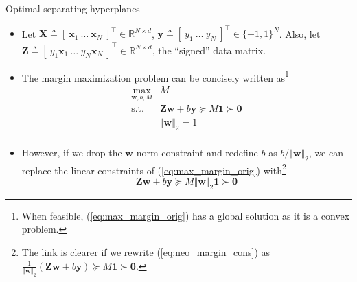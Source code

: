 \documentclass{beamer}
\numberwithin{equation}{section}
\newcommand{\aref}[1]{\alert{\ref{#1}}}
\begin{document}
\begin{frame}{Optimal separating hyperplanes}
    \begin{itemize}
        \item
        Let $ \mathbf{X} \triangleq [ \ \mathbf{x}_1 \ \ldots \
        \mathbf{x}_N \ ]^\top \in \mathbb{R}^{N \times d} $,
        $ \mathbf{y} \triangleq [ \ y_1 \ \ldots \ y_N \ ]^\top \in
        \{-1, 1\}^N $. Also, let $ \mathbf{Z} \triangleq [ \ y_1\mathbf{x}_1 \
        \ldots \ y_N\mathbf{x}_N \ ]^\top \in \mathbb{R}^{N \times d} $,
        the ``signed'' data matrix.

        \item
        The margin maximization problem can be concisely written as\footnote{
            When feasible, (\aref{eq:max_margin_orig}) has a global solution
            as it is a convex problem.
        }
        \begin{equation} \label{eq:max_margin_orig}
            \begin{array}{ll}
                \displaystyle\max_{\mathbf{w}, b, M} & M \\
                \text{s.t.} &
                \mathbf{Z}\mathbf{w} + b\mathbf{y} \succeq M\mathbf{1}
                \succ \mathbf{0} \\
                & \Vert\mathbf{w}\Vert_2 = 1 \\
            \end{array}
        \end{equation}

        \item
        However, if we drop the $ \mathbf{w} $ norm constraint and redefine
        $ b $ as $ b / \Vert\mathbf{w}\Vert_2 $, we can replace the linear
        constraints
        of (\aref{eq:max_margin_orig}) with\footnote{
            The link is clearer if we rewrite (\aref{eq:neo_margin_cons}) as
            $ \frac{1}{\Vert\mathbf{w}\Vert_2}(\mathbf{Zw} + b\mathbf{y})
            \succeq M\mathbf{1} \succ \mathbf{0} $. %
            \vspace{0.01 pt}
        } \cite{esl}
        \begin{equation} \label{eq:neo_margin_cons}
            \mathbf{Zw} + b\mathbf{y} \succeq M\Vert\mathbf{w}\Vert_2\mathbf{1}
            \succ \mathbf{0}
        \end{equation}
    \end{itemize}
\end{frame}
\end{document}
